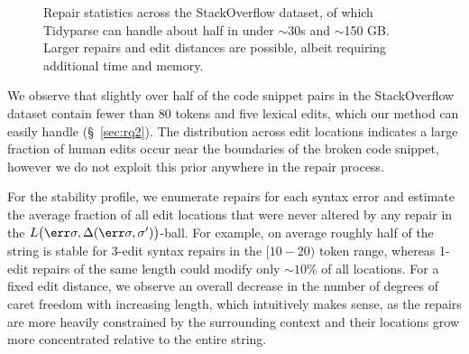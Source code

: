 \documentclass[runningheads]{llncs}
\begin{document}
\begin{figure}[h!]
    \caption{Repair statistics across the StackOverflow dataset, of which Tidyparse can handle about half in under $\sim$30s and $\sim$150 GB. Larger repairs and edit distances are possible, albeit requiring additional time and memory.}\label{fig:patch_stats}
  \end{figure}

  We observe that slightly over half of the code snippet pairs in the StackOverflow dataset contain fewer than 80 tokens and five lexical edits, which our method can easily handle (\S~\ref{sec:rq2}). The distribution across edit locations indicates a large fraction of human edits occur near the boundaries of the broken code snippet, however we do not exploit this prior anywhere in the repair process.

  For the stability profile, we enumerate repairs for each syntax error and estimate the average fraction of all edit locations that were never altered by any repair in the $L\big(\err\sigma, \Delta(\err\sigma, \sigma')\big)$-ball. For example, on average roughly half of the string is stable for 3-edit syntax repairs in the $[10-20)$ token range, whereas 1-edit repairs of the same length could modify only $\sim 10\%$ of all locations. For a fixed edit distance, we observe an overall decrease in the number of degrees of caret freedom with increasing length, which intuitively makes sense, as the repairs are more heavily constrained by the surrounding context and their locations grow more concentrated relative to the entire string.


\end{document}
